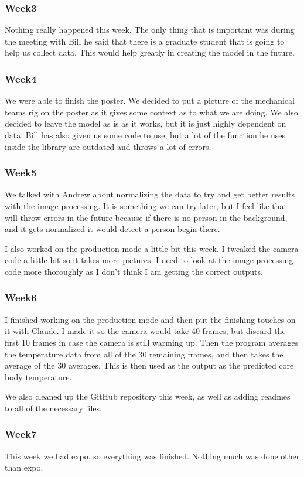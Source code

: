 	\subsubsection*{Week3}
		Nothing really happened this week. The only thing that is important was during the meeting with Bill he said that there is a graduate student that is going to help us collect data. This would help greatly in creating the model in the future.
	\subsubsection*{Week4}
		We were able to finish the poster. We decided to put a picture of the mechanical teams rig on the poster as it gives some context as to what we are doing. We also decided to leave the model as is as it works, but it is just highly dependent on data. Bill has also given us some code to use, but a lot of the function he uses inside the library are outdated and throws a lot of errors.
	\subsubsection*{Week5}
		We talked with Andrew about normalizing the data to try and get better results with the image processing. It is something we can try later, but I feel like that will throw errors in the future because if there is no person in the background, and it gets normalized it would detect a person begin there.

		I also worked on the production mode a little bit this week. I tweaked the camera code a little bit so it takes more pictures. I need to look at the image processing code more thoroughly as I don't think I am getting the correct outputs.
	\subsubsection*{Week6}
		I finished working on the production mode and then put the finishing touches on it with Claude. I made it so the camera would take 40 frames, but discard the first 10 frames in case the camera is still warming up. Then the program averages the temperature data from all of the 30 remaining frames, and then takes the average of the 30 averages. This is then used as the output as the predicted core body temperature.

		We also cleaned up the GitHub repository this week, as well as adding readmes to all of the necessary files.
	\subsubsection*{Week7}
		This week we had expo, so everything was finished. Nothing much was done other than expo.
